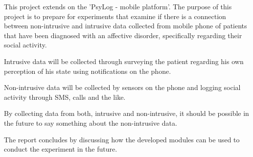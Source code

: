 This project extends on the 'PsyLog - mobile platform'\cite{faelles}.
The purpose of this project is to prepare for experiments that examine if there is a connection between non-intrusive and intrusive data collected from mobile phone of patients that have been diagnosed with an affective disorder, specifically regarding their social activity.

Intrusive data will be collected through surveying the patient regarding his own perception of his state using notifications on the phone.

Non-intrusive data will be collected by sensors on the phone and logging social activity through SMS, calls and the like.

By collecting data from both, intrusive and non-intrusive, it should be possible in the future to say something about the non-intrusive data.

The report concludes by discussing how the developed modules can be used to conduct the experiment in the future.
